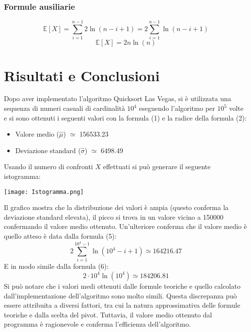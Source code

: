 \documentclass[12pt]{article}
\begin{document}
\subsubsection{Formule ausiliarie}
\begin{equation}
    \mathbb{E}[X] = \sum_{i=1}^{n-1}2\ln(n-i+1) = 2\sum_{i=1}^{n-1}\ln(n-i+1)
\end{equation}
\begin{equation}
    \mathbb{E}[X]=2n\ln(n)
\end{equation}

\section{Risultati e Conclusioni}
Dopo aver implementato l'algoritmo Quicksort Las Vegas, 
si è utilizzata una sequenza di numeri casuali di 
cardinalità $10^{4}$ eseguendo l'algoritmo per $10^{5}$ 
volte e si sono ottenuti i seguenti valori con la formula (1) e la radice della formula (2):
\begin{itemize}
    \item Valore medio ($\hat{\mu}$) $\simeq $ 156533.23
    \item Deviazione standard ($\hat{\sigma}$) $\simeq$ 6498.49
\end{itemize}
Usando il numero di confronti $X$ effettuati si può generare il seguente 
istogramma:
\begin{center}
    \texttt{[image: Istogramma.png]}
\end{center}
Il grafico mostra che la distribuzione dei valori è ampia (questo 
conferma la deviazione standard elevata), il picco si trova in un 
valore vicino a 150000 confermando il valore medio ottenuto.
Un'ulteriore conferma che il valore medio è quello atteso è data dalla 
formula (5):
\begin{equation*}
    2\sum_{i=1}^{10^{4}-1}\ln(10^{4}-i+1) \simeq 164216.47
\end{equation*}
E in modo simile dalla formula (6):
\begin{equation*}
     2\cdot 10^{4}\ln(10^{4}) \simeq 184206.81
\end{equation*}
Si può notare che i valori medi ottenuti dalle formule teoriche e quello
calcolato dall'implementazione dell'algoritmo sono molto simili.
Questa discrepanza può essere attribuita a diversi fattori, tra cui la natura
approssimativa delle formule teoriche e dalla scelta del pivot. Tuttavia,
il valore medio ottenuto dal programma è ragionevole e conferma l'efficienza
dell'algoritmo.\\
\end{document}
